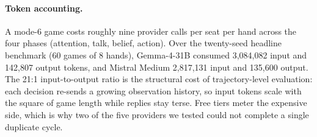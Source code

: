 \documentclass{article}
\begin{document}
\paragraph{Token accounting.} A mode-6 game costs roughly nine provider
calls per seat per hand across the four phases (attention, talk, belief,
action). Over the twenty-seed headline benchmark (60 games of 8 hands),
Gemma-4-31B consumed 3{,}084{,}082 input and 142{,}807 output tokens, and
Mistral Medium 2{,}817{,}131 input and 135{,}600 output. The 21:1 input-to-output
ratio is the structural cost of trajectory-level evaluation: each decision
re-sends a growing observation history, so input tokens scale with the
square of game length while replies stay terse. Free tiers meter the
expensive side, which is why two of the five providers we tested could not
complete a single duplicate cycle.
\end{document}
